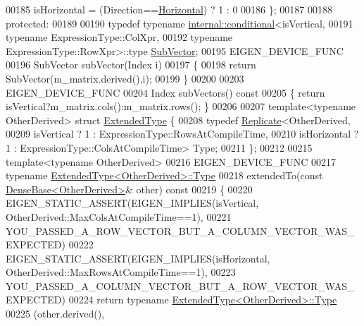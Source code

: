 \begin{DoxyCode}
00185       isHorizontal = (Direction==\hyperlink{group__enums_ggad49a7b3738e273eb00932271b36127f7aae8a16b3b9272683c1162915f6d892be}{Horizontal}) ? 1 : 0
00186     \};
00187 
00188   \textcolor{keyword}{protected}:
00189 
00190     \textcolor{keyword}{typedef} \textcolor{keyword}{typename} \hyperlink{struct_eigen_1_1internal_1_1conditional}{internal::conditional}<isVertical,
00191                                \textcolor{keyword}{typename} ExpressionType::ColXpr,
00192                                \textcolor{keyword}{typename} ExpressionType::RowXpr>::type \hyperlink{class_eigen_1_1internal_1_1_tensor_lazy_evaluator_writable}{SubVector};
00195     EIGEN\_DEVICE\_FUNC
00196     SubVector subVector(Index i)
00197     \{
00198       \textcolor{keywordflow}{return} SubVector(m\_matrix.derived(),i);
00199     \}
00200 
00203     EIGEN\_DEVICE\_FUNC
00204     Index subVectors()\textcolor{keyword}{ const}
00205 \textcolor{keyword}{    }\{ \textcolor{keywordflow}{return} isVertical?m\_matrix.cols():m\_matrix.rows(); \}
00206 
00207     \textcolor{keyword}{template}<\textcolor{keyword}{typename} OtherDerived> \textcolor{keyword}{struct }\hyperlink{struct_eigen_1_1_vectorwise_op_1_1_extended_type}{ExtendedType} \{
00208       \textcolor{keyword}{typedef} \hyperlink{group___core___module_class_eigen_1_1_replicate}{Replicate}<OtherDerived,
00209                         isVertical   ? 1 : ExpressionType::RowsAtCompileTime,
00210                         isHorizontal ? 1 : ExpressionType::ColsAtCompileTime> Type;
00211     \};
00212 
00215     \textcolor{keyword}{template}<\textcolor{keyword}{typename} OtherDerived>
00216     EIGEN\_DEVICE\_FUNC
00217     \textcolor{keyword}{typename} \hyperlink{group___core___module_class_eigen_1_1_replicate}{ExtendedType<OtherDerived>::Type}
00218     extendedTo(\textcolor{keyword}{const} \hyperlink{group___core___module_class_eigen_1_1_dense_base}{DenseBase<OtherDerived>}& other)\textcolor{keyword}{ const}
00219 \textcolor{keyword}{    }\{
00220       EIGEN\_STATIC\_ASSERT(EIGEN\_IMPLIES(isVertical, OtherDerived::MaxColsAtCompileTime==1),
00221                           YOU\_PASSED\_A\_ROW\_VECTOR\_BUT\_A\_COLUMN\_VECTOR\_WAS\_EXPECTED)
00222       EIGEN\_STATIC\_ASSERT(EIGEN\_IMPLIES(isHorizontal, OtherDerived::MaxRowsAtCompileTime==1),
00223                           YOU\_PASSED\_A\_COLUMN\_VECTOR\_BUT\_A\_ROW\_VECTOR\_WAS\_EXPECTED)
00224       \textcolor{keywordflow}{return} \textcolor{keyword}{typename} \hyperlink{group___core___module_class_eigen_1_1_replicate}{ExtendedType<OtherDerived>::Type}
00225                       (other.derived(),

\end{DoxyCode}
